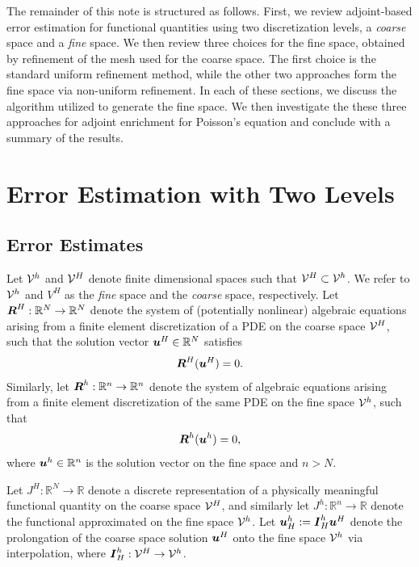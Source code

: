 The remainder of this note is structured as follows.
First, we review adjoint-based error estimation for
functional quantities using two discretization levels,
a \emph{coarse} space and a \emph{fine} space. We then
review three choices for the fine space, obtained
by refinement of the mesh used for the coarse space.
The first choice is the standard uniform refinement
method, while the other two approaches form the fine
space via non-uniform refinement. In each of these
sections, we discuss the algorithm utilized to generate
the fine space. We then investigate the these three
approaches for adjoint enrichment for Poisson's equation
and conclude with a summary of the results.

\section{Error Estimation with Two Levels}

\subsection{Error Estimates}

Let $\mathcal{V}^h$ and $\mathcal{V}^H$ denote finite dimensional spaces
such that $\mathcal{V}^H \subset \mathcal{V}^h$. We refer to $\mathcal{V}^h$
and $V^H$ as the \emph{fine} space and the \emph{coarse}
space, respectively. Let $\boldsymbol{R}^H : \mathbb{R}^N \to \mathbb{R}^N$
denote the system of (potentially nonlinear) algebraic equations
arising from a finite element discretization of a PDE on the
coarse space $\mathcal{V}^H$, such that the solution vector
$\boldsymbol{u}^H \in \mathbb{R}^N$ satisfies
%
\begin{gather}
\boldsymbol{R}^H(\boldsymbol{u}^H) = 0.
\label{eq:refine_residual_coarse}
\end{gather}
%
Similarly, let $\boldsymbol{R}^h : \mathbb{R}^n \to \mathbb{R}^n$
denote the system of algebraic equations arising from a finite
element discretization of the same PDE on the fine space
$\mathcal{V}^h$, such that
%
\begin{gather}
\boldsymbol{R}^h(\boldsymbol{u}^h) = 0,
\label{eq:refine_residual_fine}
\end{gather}
%
where $\boldsymbol{u}^h \in \mathbb{R}^n$ is the solution vector on
the fine space and $n > N$.

Let $J^H : \mathbb{R}^N \to \mathbb{R}$ denote a discrete
representation of a physically meaningful functional quantity
on the coarse space $\mathcal{V}^H$, and similarly let
$J^h : \mathbb{R}^n \to \mathbb{R}$ denote the functional
approximated on the fine space $\mathcal{V}^h$. Let
$\boldsymbol{u}^h_H := \boldsymbol{I}^h_H \boldsymbol{u}^H$ denote the prolongation of
the coarse space solution $\boldsymbol{u}^H$ onto the fine space
$\mathcal{V}^h$ via interpolation, where
$\boldsymbol{I}^h_H : \mathcal{V}^H \to \mathcal{V}^h$.

